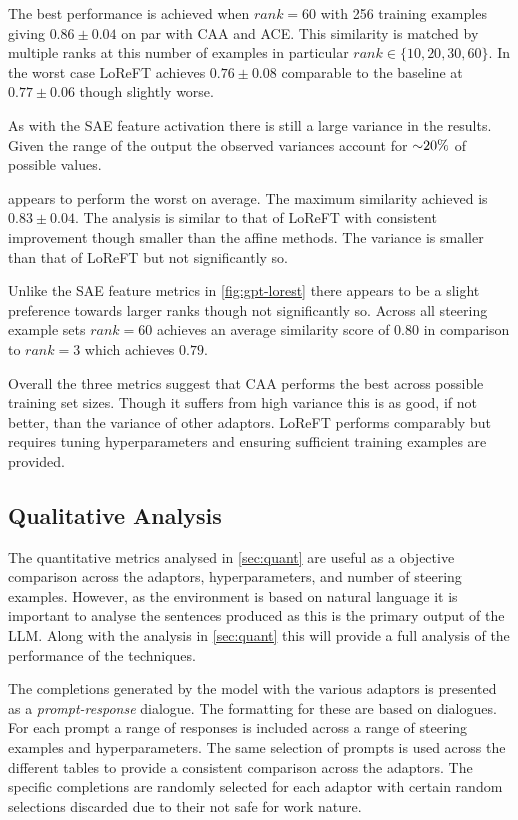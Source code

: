 The best performance is achieved when $rank = 60$ with 256 training examples giving $0.86 \pm 0.04$ on par with CAA and ACE.
This similarity is matched by multiple ranks at this number of examples in particular $rank \in \{10, 20, 30, 60\}$.
In the worst case LoReFT achieves $0.76 \pm 0.08$ comparable to the baseline at $0.77 \pm 0.06$ though slightly worse.

As with the SAE feature activation there is still a large variance in the results.
Given the range of the output the observed variances account for ${\footnotesize \sim} 20\%$ of possible values.

 appears to perform the worst on average.
The maximum similarity achieved is $0.83 \pm 0.04$.
The analysis is similar to that of LoReFT with consistent improvement though smaller than the affine methods.
The variance is smaller than that of LoReFT but not significantly so.

Unlike the SAE feature metrics in \cref{fig:gpt-lorest} there appears to be a slight preference towards larger ranks though not significantly so.
Across all steering example sets $rank = 60$ achieves an average similarity score of $0.80$ in comparison to $rank = 3$ which achieves $0.79$.

Overall the three metrics suggest that CAA performs the best across possible training set sizes.
Though it suffers from high variance this is as good, if not better, than the variance of other adaptors.
LoReFT performs comparably but requires tuning hyperparameters and ensuring sufficient training examples are provided.

\subsection{Qualitative Analysis}
\label{sec:qual}

The quantitative metrics analysed in \cref{sec:quant} are useful as a objective comparison across the adaptors, hyperparameters, and number of steering examples.
However, as the environment is based on natural language it is important to analyse the sentences produced as this is the primary output of the LLM.
Along with the analysis in \cref{sec:quant} this will provide a full analysis of the performance of the techniques.

The completions generated by the model with the various adaptors is presented as a \emph{prompt-response} dialogue.
The formatting for these are based on \cites{mwe} dialogues.
For each prompt a range of responses is included across a range of steering examples and hyperparameters.
The same selection of prompts is used across the different tables to provide a consistent comparison across the adaptors.
The specific completions are randomly selected for each adaptor with certain random selections discarded due to their not safe for work nature.

